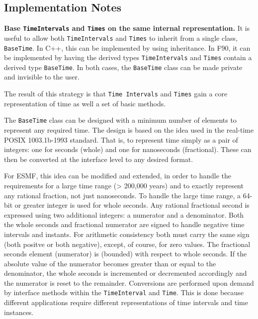 
\subsection{Implementation Notes}

{\bf Base {\tt TimeIntervals} and {\tt Times} on the same internal representation.} 
It is useful to allow both {\tt TimeIntervals} and {\tt Times} to 
inherit from a single class, {\tt BaseTime}.  In C++, this can be
implemented by using inheritance.  In F90, it can be implemented
by having the derived types {\tt TimeIntervals} and {\tt Times}
contain a derived type {\tt BaseTime}.  In both cases, the 
{\tt BaseTime} class can be made private and invisible to the user.

The result of this strategy is that {\tt Time Intervals} and 
{\tt Times} gain a core representation of time as well a set
of basic methods.

The {\tt BaseTime} class can be designed with a minimum number of elements
to represent any required time.  The design is based on the idea used
in the real-time POSIX 1003.1b-1993 standard.  That is, to represent
time simply as a pair of integers: one for seconds (whole) and one for
nanoseconds (fractional).  These can then be converted at the interface
level to any desired format.

For ESMF, this idea can be modified and extended, in order to handle the
requirements for a large time range (> 200,000 years) and to exactly
represent any rational fraction, not just nanoseconds.  To handle the
large time range, a 64-bit or greater integer is used for whole seconds.
Any rational fractional second is expressed using two additional integers:
a numerator and a denominator.  Both the whole seconds and fractional
numerator are signed to handle negative time intervals and instants.
For arithmetic consistency both must carry the same sign (both positve
or both negative), except, of course, for zero values.  The fractional
seconds element (numerator) is 
(bounded) with respect to whole seconds. If the absolute value of the
numerator becomes greater than or equal to the denominator, the whole
seconds is incremented or decremented accordingly and the numerator is
reset to the remainder.  Conversions are performed upon demand by
interface methods within the {\tt TimeInterval} and
{\tt Time}.  This is done because different applications require different
representations of time intervals and time instances.

